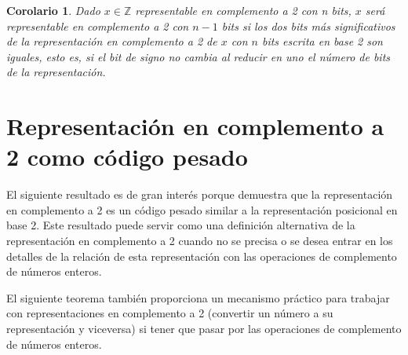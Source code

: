\documentclass[spanish,a4paper,12pt,titlepage]{article}
\newtheorem{corollary}[theorem]{Corolario}
\theoremstyle{definition}
\theoremstyle{remark}
\newcommand{\bbZ}{\mathbb{Z}}
\begin{document}
\begin{corollary}
  Dado $x \in \bbZ$ representable en complemento a 2 con n bits, $x$ será representable en complemento a 2 con $n-1$ bits si los dos bits más significativos de la representación en complemento a 2 de $x$ con $n$ bits escrita en base 2 son iguales, esto es, si el bit de signo no cambia al reducir en uno el número de bits de la representación.
\end{corollary}

\section{Representación en complemento a 2 como código pesado}

El siguiente resultado es de gran interés porque demuestra que la representación en complemento a 2 es un código pesado similar a la representación posicional en base 2. Este resultado puede servir como una definición alternativa de la representación en complemento a 2 cuando no se precisa o se desea entrar en los detalles de la relación de esta representación con las operaciones de complemento de números enteros.

El siguiente teorema también proporciona un mecanismo práctico para trabajar con representaciones en complemento a 2 (convertir un número a su representación y viceversa) si tener que pasar por las operaciones de complemento de números enteros.
\end{document}
